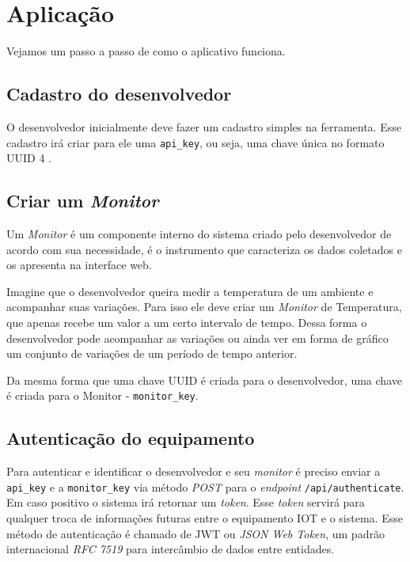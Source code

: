 \section{Aplicação}\label{aplicauxe7uxe3o}

Vejamos um passo a passo de como o aplicativo funciona.

\subsection{Cadastro do desenvolvedor}\label{cadastro-do-desenvolvedor}

O desenvolvedor inicialmente deve fazer um cadastro simples na
ferramenta. Esse cadastro irá criar para ele uma \texttt{api\_key}, ou
seja, uma chave única no formato UUID 4 \cite{rfc4122:2005}.

\subsection{Criar um \emph{Monitor}}\label{criar-um-monitor}

Um \emph{Monitor} é um componente interno do sistema criado pelo
desenvolvedor de acordo com sua necessidade, é o instrumento que
caracteriza os dados coletados e os apresenta na interface web.

Imagine que o desenvolvedor queira medir a temperatura de um ambiente e
acompanhar suas variações. Para isso ele deve criar um \emph{Monitor} de
Temperatura, que apenas recebe um valor a um certo intervalo de tempo.
Dessa forma o desenvolvedor pode acompanhar as variações ou ainda ver em
forma de gráfico um conjunto de variações de um período de tempo
anterior.

Da mesma forma que uma chave UUID é criada para o desenvolvedor, uma
chave é criada para o Monitor - \texttt{monitor\_key}.

\subsection{Autenticação do
equipamento}\label{autenticauxe7uxe3o-do-equipamento}

Para autenticar e identificar o desenvolvedor e seu \emph{monitor} é
preciso enviar a \texttt{api\_key} e a \texttt{monitor\_key} via método
\emph{POST} para o \emph{endpoint} \texttt{/api/authenticate}. Em caso
positivo o sistema irá retornar um \emph{token}. Esse \emph{token}
servirá para qualquer troca de informações futuras entre o equipamento
IOT e o sistema. Esse método de autenticação é chamado de JWT ou
\emph{JSON Web Token}, um padrão internacional \emph{RFC 7519} para
intercâmbio de dados entre entidades.

